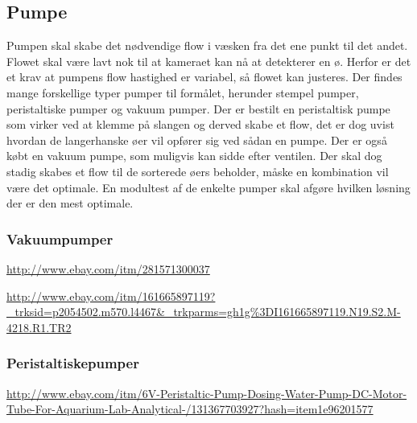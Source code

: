 \subsection{Pumpe}
Pumpen skal skabe det nødvendige flow i væsken fra det ene punkt til det andet. Flowet skal være lavt nok til at kameraet kan nå at detekterer en ø. Herfor er det et krav at pumpens flow hastighed er variabel, så flowet kan justeres. Der findes mange forskellige typer pumper til formålet, herunder stempel pumper, peristaltiske pumper og vakuum pumper. Der er bestilt en peristaltisk pumpe som virker ved at klemme på slangen og derved skabe et flow, det er dog uvist hvordan de langerhanske øer vil opfører sig ved sådan en pumpe. Der er også købt en vakuum pumpe, som muligvis kan sidde efter ventilen. Der skal dog stadig skabes et flow til de sorterede øers beholder, måske en kombination vil være det optimale. En modultest af de enkelte pumper skal afgøre hvilken løsning der er den mest optimale. 

\subsubsection{Vakuumpumper}
\url{ http://www.ebay.com/itm/281571300037}

\url{http://www.ebay.com/itm/161665897119?_trksid=p2054502.m570.l4467&_trkparms=gh1g%3DI161665897119.N19.S2.M-4218.R1.TR2}

\subsubsection{Peristaltiskepumper}

\url{http://www.ebay.com/itm/6V-Peristaltic-Pump-Dosing-Water-Pump-DC-Motor-Tube-For-Aquarium-Lab-Analytical-/131367703927?hash=item1e96201577}


